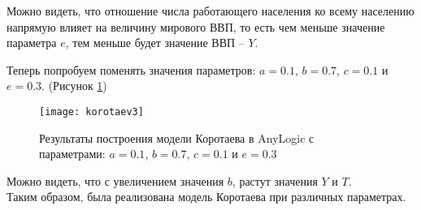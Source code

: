 Можно видеть, что отношение числа работающего населения ко всему населению напрямую влияет на величину мирового ВВП, то есть чем меньше значение параметра $e$, тем меньше будет значение ВВП -- $Y$.

Теперь попробуем поменять значения параметров: $a = 0.1$, $b = 0.7$, $c = 0.1$ и $e = 0.3$. (Рисунок \ref{fig:korotaev3})
\begin{figure}[h]
	\centering \texttt{[image: korotaev3]}
	\caption{Результаты построения модели Коротаева в AnyLogic с параметрами: $a = 0.1$, $b = 0.7$, $c = 0.1$ и $e = 0.3$}
	\label{fig:korotaev3}
\end{figure}

Можно видеть, что с увеличением значения $b$, растут значения $Y$ и $T$.\\

Таким образом, была реализована модель Коротаева при различных параметрах.